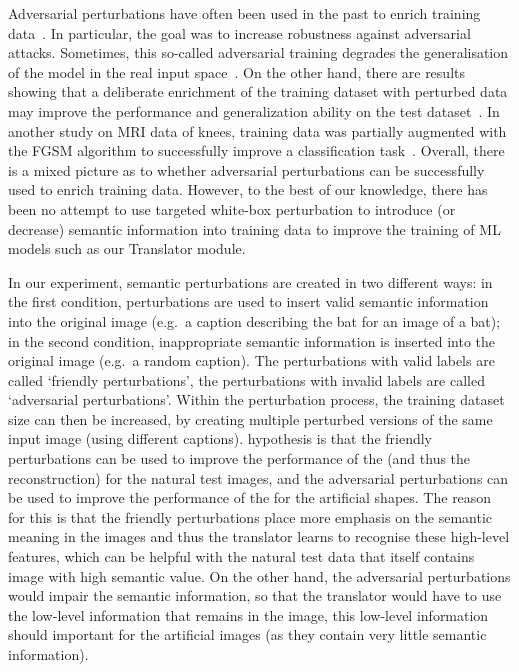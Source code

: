 Adversarial perturbations have often been used in the past to enrich training data~\cite{goodfellowExplainingHarnessingAdversarial2014,madryDeepLearningModels2019}. In particular, the goal was to increase robustness against adversarial attacks. Sometimes, this so-called adversarial training degrades the generalisation of the model in the real input space~\cite{kurakinAdversarialMachineLearning2017}. On the other hand, there are results showing that a deliberate enrichment of the training dataset with perturbed data may improve the performance and generalization ability on the test dataset~\cite{xieAdversarialExamplesImprove2020}.  In another study on MRI data of knees, training data was partially augmented with the FGSM algorithm to successfully improve a classification task~\cite{yanEnhancingClassificationPerformance2023}. Overall, there is a mixed picture as to whether adversarial perturbations can be successfully used to enrich training data. However, to the best of our knowledge, there has been no attempt to use targeted white-box perturbation to introduce (or decrease) semantic information into training data to improve the training of ML models such as our Translator module. 


In our experiment, semantic perturbations are created in two different ways: in the first condition, perturbations are used to insert valid semantic information into the original image (e.g.\ a caption describing the bat for an image of a bat); in the second condition, inappropriate semantic information is inserted into the original image (e.g.\ a random caption). The perturbations with valid labels are called `friendly perturbations', the perturbations with invalid labels are called `adversarial perturbations'. Within the perturbation process, the training dataset size can then be increased, by creating multiple perturbed versions of the same input image (using different captions).   hypothesis is that the friendly perturbations can be used to improve the performance of the  (and thus the reconstruction) for the natural test images, and the adversarial perturbations can be used to improve the performance of the  for the artificial shapes. The reason for this is that the friendly perturbations place more emphasis on the semantic meaning in the images and thus the translator learns to recognise these high-level features, which can be helpful with the natural test data that itself contains image with high semantic value. On the other hand, the adversarial perturbations would impair the semantic information, so that the translator would have to use the low-level information that remains in the image, this low-level information should important for the artificial images (as they contain very little semantic information).


